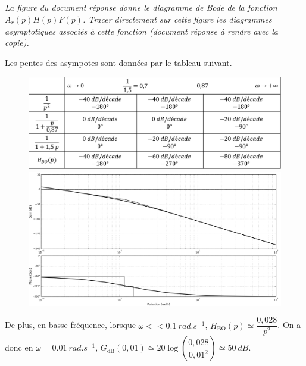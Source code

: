 \subparagraph{\label{q_15}}\textit{La figure du document réponse donne le diagramme de Bode de la fonction $A_r(p)H(p)F(p)$. Tracer
directement sur cette figure les diagrammes asymptotiques associés à cette fonction (document réponse à rendre
avec la copie).}
\ifprof
\begin{corrige}
Les pentes des asympotes sont données par le tableau suivant. 
\begin{figure}[H]
\centering
\includegraphics[width=.8\linewidth]{images/cor_q15}

\includegraphics[width=.8\linewidth]{images/cor_q15_bode}
\end{figure}

De plus, en basse fréquence, lorsque 
$\omega << \SI{0,1}{rad.s^{-1}}$, 
$H_{\text{BO}}(p)\simeq \dfrac{0,028}{p^2}$. 
On a donc  en $\omega = \SI{0,01}{rad.s^{-1}}$, $G_{\text{dB}}(0,01)\simeq 20\log \left(\dfrac{0,028}{0,01^2}\right)\simeq \SI{50}{dB}$.


\end{corrige}
\else
\fi

